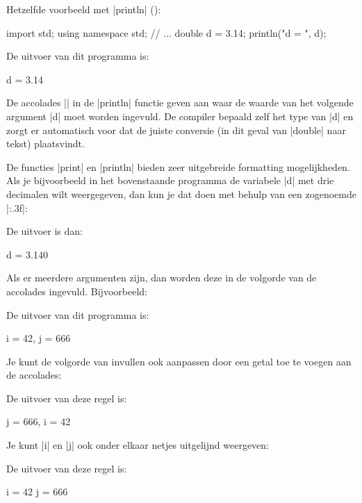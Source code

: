 \begin{cpplstShortInline}
Hetzelfde voorbeeld met |println| ():
\begin{cpplstfragment}
import std;
using namespace std;
//  ...
	double d = 3.14;
	println("d = {}", d);
\end{cpplstfragment}

De uitvoer van dit programma is:
\begin{coutput}
d = 3.14
\end{coutput}
De accolades |{}| in de |println| functie geven aan waar de waarde van het volgende argument |d| moet worden ingevuld.
De compiler bepaald zelf het type van |d| en zorgt er automatisch voor dat de juiste conversie (in dit geval van |double| naar tekst) plaatsvindt.

De functies |print| en |println| bieden zeer uitgebreide formatting mogelijkheden.
Als je bijvoorbeeld in het bovenstaande programma de variabele |d| met drie decimalen wilt weergegeven, dan kun je dat doen met behulp van een zogenoemde \emph{} |{:.3f}|:

De uitvoer is dan:
\begin{coutput}
d = 3.140
\end{coutput}
Als er meerdere argumenten zijn, dan worden deze in de volgorde van de accolades ingevuld.
Bijvoorbeeld:

De uitvoer van dit programma is:
\begin{coutput}
i = 42, j = 666
\end{coutput}
Je kunt de volgorde van invullen ook aanpassen door een getal toe te voegen aan de accolades:

De uitvoer van deze regel is:
\begin{coutput}
j = 666, i = 42
\end{coutput}

Je kunt |i| en |j| ook onder elkaar netjes uitgelijnd weergeven:

De uitvoer van deze regel is:
\begin{coutput}
i =   42
j =  666
\end{coutput}


\end{cpplstShortInline}
